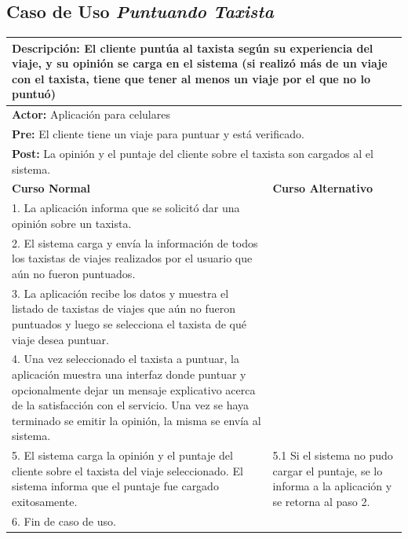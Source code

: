 \documentclass[a4paper]{article}
\begin{document}
\subsection{Caso de Uso \textit{Puntuando Taxista}}
\begin{center}
\begin{tabular}{|p{10cm} | p{6cm}|}
\hline
\multicolumn{2}{|p{16cm}|}{\textbf{Descripci\'on:} El cliente punt\'ua al taxista seg\'un su experiencia del viaje, y su opini\'on se carga en el sistema (si realiz\'o m\'as de un viaje con el taxista, tiene que tener al menos un viaje por el que no lo puntu\'o)} \\
\hline
\multicolumn{2}{|l|}{\textbf{Actor:} Aplicaci\'on para celulares } \\
\hline
\multicolumn{2}{|p{15.5cm}|}{\textbf{Pre:} El cliente tiene un viaje para puntuar y est\'a verificado.} \\
\hline
\multicolumn{2}{|p{14cm}|}{\textbf{Post:} La opini\'on y el puntaje del cliente sobre el taxista son cargados al el sistema. }\\
\hline
\textbf{Curso Normal}  & \textbf{Curso Alternativo} \\ \hline
1. La aplicaci\'on informa que se solicit\'o dar una opini\'on sobre un taxista. & \\ \hline
2. El sistema carga y env\'ia la informaci\'on de todos los taxistas de viajes realizados por el usuario que a\'un no fueron puntuados. & \\ \hline
3. La aplicaci\'on recibe los datos y muestra el listado de taxistas de viajes que a\'un no fueron puntuados y luego se selecciona el taxista de qu\'e viaje desea puntuar.  & \\ \hline
4. Una vez seleccionado el taxista a puntuar, la aplicaci\'on muestra una interfaz donde puntuar y opcionalmente dejar un mensaje explicativo acerca de la satisfacci\'on con el servicio. Una vez se haya terminado se emitir la opini\'on, la misma se env\'ia al sistema. & \\ \hline
5. El sistema carga la opini\'on y el puntaje del cliente sobre el taxista del viaje seleccionado. El sistema informa que el puntaje fue cargado exitosamente. & 5.1 Si el sistema no pudo cargar el puntaje, se lo informa a la aplicaci\'on y se retorna al paso 2.\\ \hline
6. Fin de caso de uso. & \\ \hline


\end{tabular}
\end{center}
\end{document}
